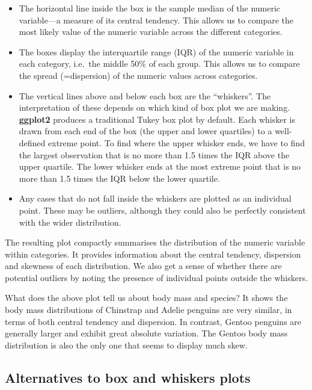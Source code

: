 \documentclass[
]{book}
\begin{document}
\begin{itemize}
\item
  The horizontal line inside the box is the sample median of the numeric variable---a measure of its central tendency. This allows us to compare the most likely value of the numeric variable across the different categories.
\item
  The boxes display the interquartile range (IQR) of the numeric variable in each category, i.e.~the middle 50\% of each group. This allows us to compare the spread (=dispersion) of the numeric values across categories.
\item
  The vertical lines above and below each box are the ``whiskers''. The interpretation of these depends on which kind of box plot we are making. \textbf{ggplot2} produces a traditional Tukey box plot by default. Each whisker is drawn from each end of the box (the upper and lower quartiles) to a well-defined extreme point. To find where the upper whisker ends, we have to find the largest observation that is no more than 1.5 times the IQR above the upper quartile. The lower whisker ends at the most extreme point that is no more than 1.5 times the IQR below the lower quartile.
\item
  Any cases that do not fall inside the whiskers are plotted as an individual point. These may be outliers, although they could also be perfectly consistent with the wider distribution.
\end{itemize}

The resulting plot compactly summarises the distribution of the numeric variable within categories. It provides information about the central tendency, dispersion and skewness of each distribution. We also get a sense of whether there are potential outliers by noting the presence of individual points outside the whiskers.

What does the above plot tell us about body mass and species? It shows the body mass distributions of Chinstrap and Adelie penguins are very similar, in terms of both central tendency and dispersion. In contrast, Gentoo penguins are generally larger and exhibit great absolute variation. The Gentoo body mass distribution is also the only one that seems to display much skew.

\hypertarget{alternatives-to-box-and-whiskers-plots}{%
\subsection{Alternatives to box and whiskers plots}\label{alternatives-to-box-and-whiskers-plots}}
\end{document}
